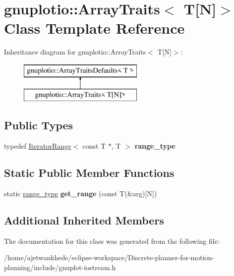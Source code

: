 \hypertarget{classgnuplotio_1_1ArrayTraits_3_01T[N]_4}{}\section{gnuplotio\+:\+:Array\+Traits$<$ T\mbox{[}N\mbox{]}$>$ Class Template Reference}
\label{classgnuplotio_1_1ArrayTraits_3_01T[N]_4}
Inheritance diagram for gnuplotio\+:\+:Array\+Traits$<$ T\mbox{[}N\mbox{]}$>$\+:\begin{figure}[H]
\begin{center}
\leavevmode
\includegraphics[height=2.000000cm]{classgnuplotio_1_1ArrayTraits_3_01T[N]_4}
\end{center}
\end{figure}
\subsection*{Public Types}
\begin{DoxyCompactItemize}
\item 
\mbox{\label{classgnuplotio_1_1ArrayTraits_3_01T[N]_4_a926f3c3d14fbe82aab7b70ccc16d20fb}} 
typedef \mbox{\hyperlink{classgnuplotio_1_1IteratorRange}{Iterator\+Range}}$<$ const T $\ast$, T $>$ {\bfseries range\+\_\+type}
\end{DoxyCompactItemize}
\subsection*{Static Public Member Functions}
\begin{DoxyCompactItemize}
\item 
\mbox{\label{classgnuplotio_1_1ArrayTraits_3_01T[N]_4_adc9c1ce6da4923418f367e08c150a928}} 
static \mbox{\hyperlink{classgnuplotio_1_1IteratorRange}{range\+\_\+type}} {\bfseries get\+\_\+range} (const T(\&arg)\mbox{[}N\mbox{]})
\end{DoxyCompactItemize}
\subsection*{Additional Inherited Members}


The documentation for this class was generated from the following file\+:\begin{DoxyCompactItemize}
\item 
/home/ajetwankhede/eclipse-\/workspace/\+Discrete-\/planner-\/for-\/motion-\/planning/include/gnuplot-\/iostream.\+h\end{DoxyCompactItemize}
